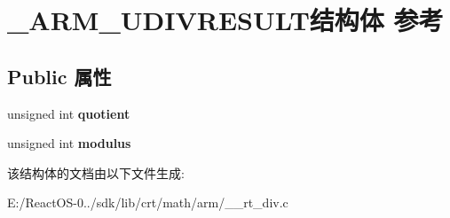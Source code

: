 \hypertarget{struct___a_r_m___u_d_i_v_r_e_s_u_l_t}{}\section{\+\_\+\+A\+R\+M\+\_\+\+U\+D\+I\+V\+R\+E\+S\+U\+L\+T结构体 参考}
\label{struct___a_r_m___u_d_i_v_r_e_s_u_l_t}
\subsection*{Public 属性}
\begin{DoxyCompactItemize}
\item 
\mbox{\label{struct___a_r_m___u_d_i_v_r_e_s_u_l_t_a3110dad96ed175dec20bd14d9e72cb8d}} 
unsigned int {\bfseries quotient}
\item 
\mbox{\label{struct___a_r_m___u_d_i_v_r_e_s_u_l_t_a030401ea5427bd9c0ba266c9e32e4dfc}} 
unsigned int {\bfseries modulus}
\end{DoxyCompactItemize}


该结构体的文档由以下文件生成\+:\begin{DoxyCompactItemize}
\item 
E\+:/\+React\+O\+S-\/0../sdk/lib/crt/math/arm/\+\_\+\+\_\+rt\+\_\+div.\+c\end{DoxyCompactItemize}
